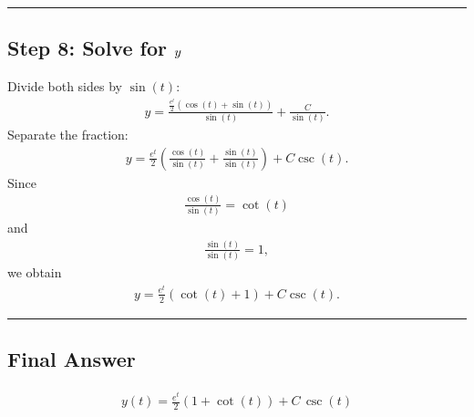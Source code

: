\documentclass[letterpaper,10pt,english]{sphinxmanual}
\begin{document}
\bigskip\hrule\bigskip



\subsection{Step 8: Solve for \protect\(y\protect\)}
\label{\detokenize{Language/Science_language/ODE_calculus/course_MATH_3035/homework_assignments/index_pdf:step-8-solve-for-y}}
\sphinxAtStartPar
Divide both sides by \(\sin(t)\):
\begin{equation*}
\begin{split}y
=
\frac{\frac{e^t}{2}(\cos(t)+\sin(t))}
     {\sin(t)}
+
\frac{C}{\sin(t)}.\end{split}
\end{equation*}
\sphinxAtStartPar
Separate the fraction:
\begin{equation*}
\begin{split}y
=
\frac{e^t}{2}
\left(
\frac{\cos(t)}{\sin(t)}
+
\frac{\sin(t)}{\sin(t)}
\right)
+
C\csc(t).\end{split}
\end{equation*}
\sphinxAtStartPar
Since
\begin{equation*}
\begin{split}\frac{\cos(t)}{\sin(t)}
=
\cot(t)\end{split}
\end{equation*}
\sphinxAtStartPar
and
\begin{equation*}
\begin{split}\frac{\sin(t)}{\sin(t)}
=
1,\end{split}
\end{equation*}
\sphinxAtStartPar
we obtain
\begin{equation*}
\begin{split}y
=
\frac{e^t}{2}
\left(
\cot(t)+1
\right)
+
C\csc(t).\end{split}
\end{equation*}

\bigskip\hrule\bigskip



\subsection{Final Answer}
\label{\detokenize{Language/Science_language/ODE_calculus/course_MATH_3035/homework_assignments/index_pdf:final-answer}}\begin{equation*}
\begin{split}\boxed{
y(t)
=
\frac{e^t}{2}
\left(
1+\cot(t)
\right)
+
C\,\csc(t)
}\end{split}
\end{equation*}


\renewcommand{\indexname}{Index}
\printindex
\end{document}
